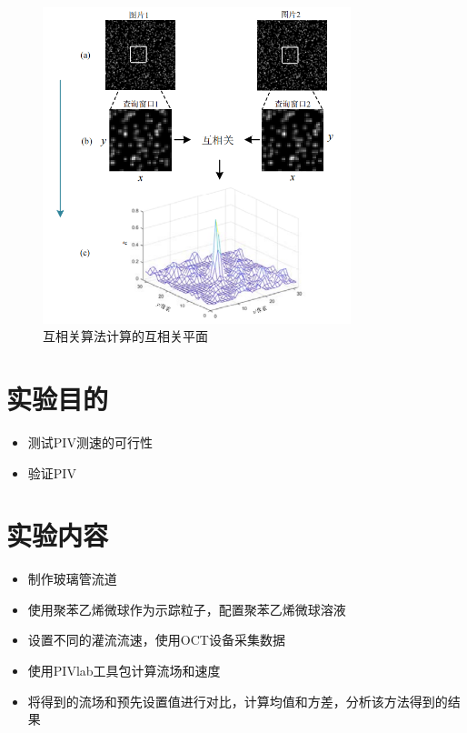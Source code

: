 \documentclass[12pt]{article}
\begin{document}
    \begin{figure}
        \centering
        \includegraphics[width=0.8\textwidth]{Images/互相关示意图.png}
        \caption{互相关算法计算的互相关平面}
        
    \end{figure}
    

\section{实验目的}
\begin{itemize}
    \item 测试PIV测速的可行性
    \item 验证PIV

\end{itemize}

\section{实验内容}
\begin{itemize}

    \item 制作玻璃管流道
    \item 使用聚苯乙烯微球作为示踪粒子，配置聚苯乙烯微球溶液
    \item 设置不同的灌流流速，使用OCT设备采集数据
    \item 使用PIVlab工具包计算流场和速度
    \item 将得到的流场和预先设置值进行对比，计算均值和方差，分析该方法得到的结果
\end{itemize}
\end{document}

